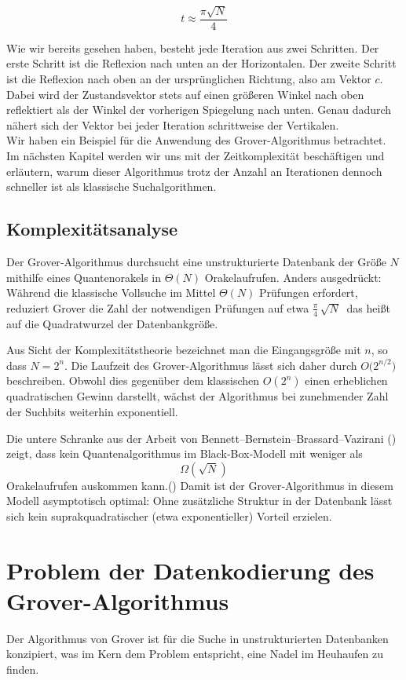 {$$
t \approx \frac{\pi \sqrt{N}}{4}
$$

Wie wir bereits gesehen haben, besteht jede Iteration aus zwei Schritten. Der erste Schritt ist die Reflexion nach unten an der Horizontalen. Der zweite Schritt ist die Reflexion nach oben an der ursprünglichen Richtung, also am Vektor $c$. Dabei wird der Zustandsvektor stets auf einen größeren Winkel nach oben reflektiert als der Winkel der vorherigen Spiegelung nach unten. Genau dadurch nähert sich der Vektor bei jeder Iteration schrittweise der Vertikalen.\\

Wir haben ein Beispiel für die Anwendung des Grover-Algorithmus betrachtet. Im nächsten Kapitel werden wir uns mit der Zeitkomplexität beschäftigen und erläutern, warum dieser Algorithmus trotz der Anzahl an Iterationen dennoch schneller ist als klassische Suchalgorithmen.


\subsection{Komplexitätsanalyse}
Der Grover‐Algorithmus durchsucht eine unstrukturierte Datenbank der Größe \(N\) mithilfe eines Quantenorakels in \(\Theta(N)\) Orakelaufrufen. Anders ausgedrückt: Während die klassische Vollsuche im Mittel \(\Theta(N)\) Prüfungen erfordert, reduziert Grover die Zahl der notwendigen Prüfungen auf etwa $\frac{\pi}{4}\,\sqrt{N}\ $ das heißt auf die Quadratwurzel der Datenbankgröße.

Aus Sicht der Komplexitätstheorie bezeichnet man die Eingangsgröße mit \(n\), so dass $N = 2^n$.
Die Laufzeit des Grover‐Algorithmus lässt sich daher durch  
$O\bigl(2^{n/2}\bigr)$ beschreiben. Obwohl dies gegenüber dem klassischen \(O(2^n)\) einen erheblichen quadratischen Gewinn darstellt, wächst der Algorithmus bei zunehmender Zahl der Suchbits weiterhin exponentiell.

Die untere Schranke aus der Arbeit von Bennett–Bernstein–Brassard–Vazirani (\cite{zotero-1212}) zeigt, dass kein Quantenalgorithmus im Black‐Box‐Modell mit weniger als  
\[
\Omega(\sqrt{N})
\]  
Orakelaufrufen auskommen kann.(\cite{zotero-1211}) Damit ist der Grover‐Algorithmus in diesem Modell asymptotisch optimal: Ohne zusätzliche Struktur in der Datenbank lässt sich kein suprakquadratischer (etwa exponentieller) Vorteil erzielen.  

\section{Problem der Datenkodierung des Grover-Algorithmus}
Der Algorithmus von Grover ist für die Suche in unstrukturierten Datenbanken konzipiert, was im Kern dem Problem entspricht, eine Nadel im Heuhaufen zu finden.\\

}
